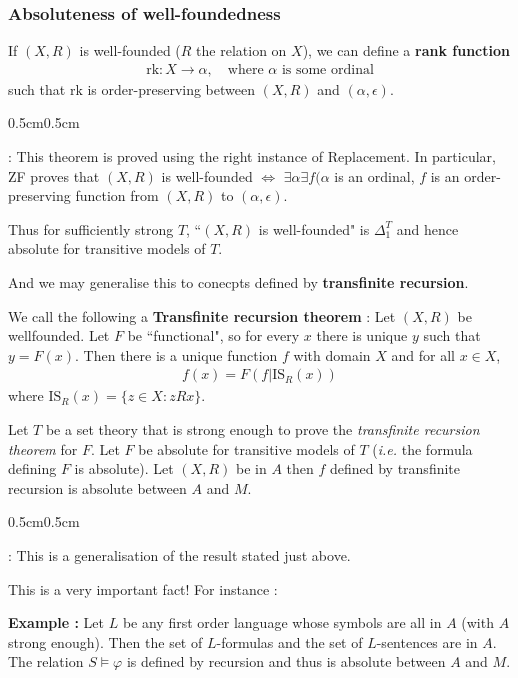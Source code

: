 \documentclass[12pt,a4paper]{article}
\newenvironment{proof}
{\begin{changemargin}{0.5cm}{0.5cm} 
	}%
	{\end{changemargin}
}
\newenvironment{p}
{\begin{proof} 
	}%
	{\end{proof}
}
\begin{document}
\subsubsection*{Absoluteness of well-foundedness}

If $(X, R)$ is well-founded ($R$ the relation on $X$), we can define a \textbf{rank function}
\begin{align*}
\text{rk} : X \rightarrow \alpha, \quad \text{where } \alpha \text{ is some ordinal}
\end{align*}
such that $\text{rk}$ is order-preserving between $(X,R)$ and $(\alpha, \epsilon)$.
\begin{p}
: This theorem is proved using the right instance of Replacement. In particular, ZF proves that $(X, R)$ is well-founded $\Leftrightarrow$ $\exists \alpha \exists f (\alpha$ is an ordinal, $f$ is an order-preserving function from $(X, R)$ to $(\alpha, \epsilon)$.

\quad Thus for sufficiently strong $T$, ``$(X, R)$ is well-founded" is $\Delta_1^T$ and hence absolute for transitive models of $T$.
\end{p}
And we may generalise this to conecpts defined by \textbf{transfinite recursion}.
\s

 We call the following a \textbf{Transfinite recursion theorem} : Let $(X,R)$ be wellfounded. Let $F$ be ``functional", so for every $x$ there is unique $y$ such that $y = F(x)$. Then there is a unique function $f$ with domain $X$ and for all $x\in X$,
\begin{align*}
f(x) = F(f | \text{IS}_R(x))
\end{align*}
where $\text{IS}_R(x) = \{ z\in X : zRx \}$.
\s

\prop Let $T$ be a set theory that is strong enough to prove the \emph{transfinite recursion theorem} for $F$. Let $F$ be absolute for transitive models of $T$ (\textit{i.e.} the formula defining $F$ is absolute). Let $(X, R)$ be in $A$ then $f$ defined by transfinite recursion is absolute between $A$ and $M$.
\begin{p}
: This is a generalisation of the result stated just above.
\end{p}
\s

This is a very important fact! For instance :
\s

\textbf{Example :} Let $L$ be any first order language whose symbols are all in $A$ (with $A$ strong enough). Then the set of $L$-formulas and the set of $L$-sentences are in $A$. The relation $S\models \varphi$ is defined by recursion and thus is absolute between $A$ and $M$.
\end{document}
